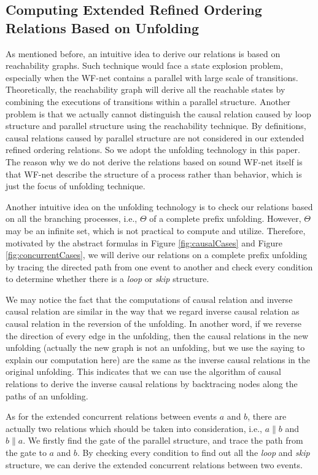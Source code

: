 \documentclass{llncs}
\begin{document}
\subsection{Computing Extended Refined Ordering Relations Based on Unfolding}\label{subsec:computationOfRelations}
As mentioned before, an intuitive idea to derive our relations is based on reachability graphs. Such technique would face a state explosion problem, especially when the WF-net contains a parallel with large scale of transitions. Theoretically, the reachability graph will derive all the reachable states by combining the executions of transitions within a parallel structure. Another problem is that we actually cannot distinguish the causal relation caused by loop structure and parallel structure using the reachability technique. By definitions, causal relations caused by parallel structure are not considered in our extended refined ordering relations. So we adopt the unfolding technology in this paper. The reason why we do not derive the relations based on sound WF-net itself is that WF-net describe the structure of a process rather than behavior, which is just the focus of unfolding technique.

Another intuitive idea on the unfolding technology is to check our relations based on all the branching processes, i.e., $\Theta$ of a complete prefix unfolding. However, $\Theta$ may be an infinite set, which is not practical to compute and utilize. Therefore, motivated by the abstract formulas in Figure \ref{fig:causalCases} and Figure \ref{fig:concurrentCases}, we will derive our relations on a complete prefix unfolding by tracing the directed path from one event to another and check every condition to determine whether there is a \textit{loop} or \textit{skip} structure.

We may notice the fact that the computations of causal relation and inverse causal relation are similar in the way that we regard inverse causal relation as causal relation in the reversion of the unfolding. In another word, if we reverse the direction of every edge in the unfolding, then the causal relations in the new unfolding (actually the new graph is not an unfolding, but we use the saying to explain our computation here) are the same as the inverse causal relations in the original unfolding. This indicates that we can use the algorithm of causal relations to derive the inverse causal relations by backtracing nodes along the paths of an unfolding.

As for the extended concurrent relations between events $a$ and $b$, there are actually two relations which should be taken into consideration, i.e., $a\parallel b$ and $b\parallel a$. We firstly find the gate of the parallel structure, and trace the path from the gate to $a$ and $b$. By checking every condition to find out all the \textit{loop} and \textit{skip} structure, we can derive the extended concurrent relations between two events.
\end{document}
